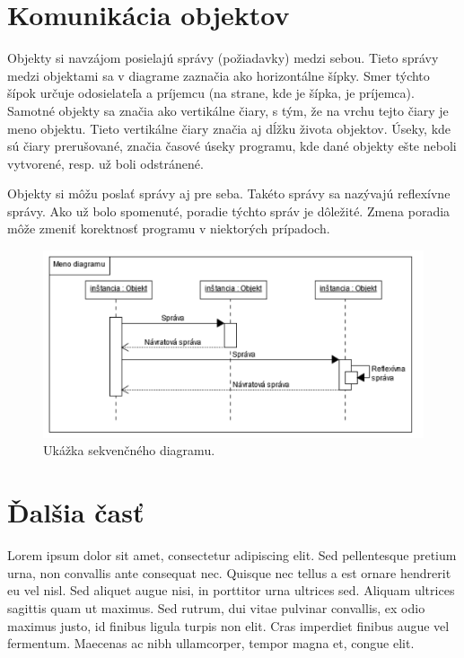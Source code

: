 \documentclass[10pt,slovak,a4paper]{article}
\begin{document}
\section{Komunikácia objektov}

\noindent Objekty si navzájom posielajú správy (požiadavky) medzi sebou. Tieto
správy medzi objektami sa v diagrame zaznačia ako horizontálne šípky. Smer týchto šípok určuje odosielateľa a
príjemcu (na strane, kde je šípka, je príjemca). Samotné objekty sa značia ako vertikálne čiary, s tým, že
na vrchu tejto čiary je meno objektu. Tieto vertikálne čiary značia aj dĺžku života objektov. Úseky, kde sú
čiary prerušované, značia časové úseky programu, kde dané objekty ešte neboli vytvorené, resp. už boli odstránené. \newline

\noindent Objekty si môžu poslať správy aj pre seba. Takéto správy sa nazývajú reflexívne správy. 
Ako už bolo spomenuté, poradie týchto správ je dôležité. Zmena poradia môže zmeniť korektnosť programu
v niektorých prípadoch. \cite{petraq14}


\begin{figure}[tbh]
\centering
\includegraphics[scale=0.8]{simple_diag.pdf}
\caption{Ukážka sekvenčného diagramu.\cite{booch00}}
\end{figure}

\section{Ďalšia časť}

Lorem ipsum dolor sit amet, consectetur adipiscing elit. Sed pellentesque pretium urna, non convallis ante consequat nec. 
Quisque nec tellus a est ornare hendrerit eu vel nisl. Sed aliquet augue nisi, in porttitor urna ultrices sed.
Aliquam ultrices sagittis quam ut maximus. Sed rutrum, dui vitae pulvinar convallis, ex odio maximus justo, id finibus ligula turpis non elit. 
Cras imperdiet finibus augue vel fermentum. Maecenas ac nibh ullamcorper, tempor magna et, congue elit.
\end{document}
